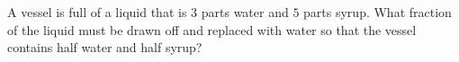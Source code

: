 A vessel is full of a liquid that is $3$ parts water and $5$ parts syrup. What fraction of the liquid must be drawn off and replaced with water so that the vessel contains half water and half syrup?
